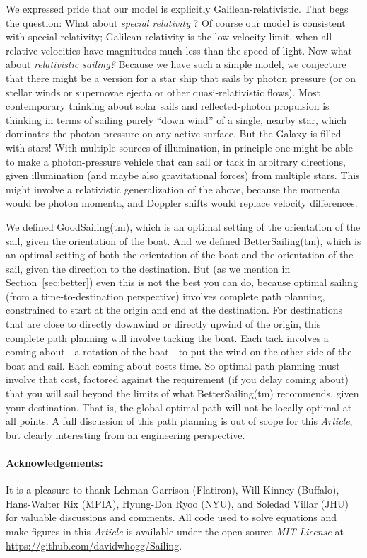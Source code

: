 \documentclass[letterpaper]{article}
\newcommand{\documentname}{\textsl{Article}}
\newcommand{\secref}[1]{Section~\ref{#1}}
\begin{document}
We expressed pride that our model is explicitly Galilean-relativistic.
That begs the question: What about \emph{special relativity} \cite{sr}?
Of course our model is consistent with special relativity; Galilean relativity is the low-velocity limit, when all relative velocities have magnitudes much less than the speed of light.
Now what about \emph{relativistic sailing?}
Because we have such a simple model, we conjecture that there might be a version for a star ship that sails by photon pressure (or on stellar winds or supernovae ejecta or other quasi-relativistic flows).
Most contemporary thinking about solar sails and reflected-photon propulsion is thinking in terms of sailing purely ``down wind'' of a single, nearby star, which dominates the photon pressure on any active surface.
But the Galaxy is filled with stars!
With multiple sources of illumination, in principle one might be able to make a photon-pressure vehicle that can sail or tack in arbitrary directions, given illumination (and maybe also gravitational forces) from multiple stars.
This might involve a relativistic generalization of the above, because the momenta would be photon momenta, and Doppler shifts would replace velocity differences.

We defined GoodSailing(tm), which is an optimal setting of the orientation of the sail, given the orientation of the boat.
And we defined BetterSailing(tm), which is an optimal setting of both the orientation of the boat and the orientation of the sail, given the direction to the destination.
But (as we mention in \secref{sec:better}) even this is not the best you can do, because optimal sailing (from a time-to-destination perspective) involves complete path planning, constrained to start at the origin and end at the destination.
For destinations that are close to directly downwind or directly upwind of the origin, this complete path planning will involve tacking the boat.
Each tack involves a coming about---a rotation of the boat---to put the wind on the other side of the boat and sail.
Each coming about costs time.
So optimal path planning must involve that cost, factored against the requirement (if you delay coming about) that you will sail beyond the limits of what BetterSailing(tm) recommends, given your destination.
That is, the global optimal path will not be locally optimal at all points.
A full discussion of this path planning is out of scope for this \documentname, but clearly interesting from an engineering perspective.

\paragraph{Acknowledgements:}
It is a pleasure to thank
  Lehman Garrison (Flatiron),
  Will Kinney (Buffalo),
  Hans-Walter Rix (MPIA),
  Hyung-Don Ryoo (NYU), and
  Soledad Villar (JHU)
for valuable discussions and comments.
All code used to solve equations and make figures in this \documentname{} is available under the open-source \textsl{MIT License} at \url{https://github.com/davidwhogg/Sailing}.



\end{document}
